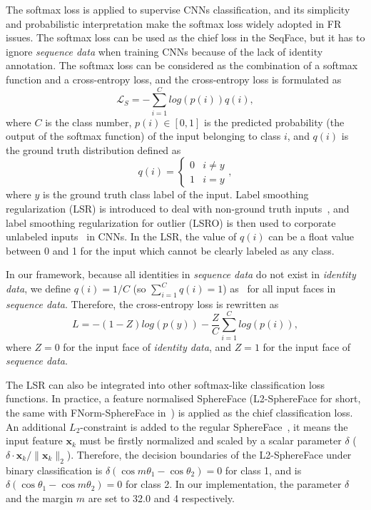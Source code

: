 \documentclass[conference]{acmsiggraph}
\renewcommand{\vec}[1]{\mathbf{#1}}
\begin{document}
The softmax loss is applied to supervise CNNs classification, and its simplicity and probabilistic interpretation make the softmax loss widely adopted in FR issues. The softmax loss can be used as the chief loss in the SeqFace, but it has to ignore \emph{sequence data} when training CNNs because of the lack of identity annotation. The softmax loss can be considered as the combination of a softmax function and a cross-entropy loss, and the cross-entropy loss is formulated as
\begin{equation}
\label{equLoss}
\mathcal{L}_S=-\sum\limits_{i=1}^Clog(p(i))q(i),
\end{equation}
where $C$ is the class number, $p(i) \in [0,1]$ is the predicted probability (the output of the softmax function) of the input belonging to class $i$, and $q(i)$ is the ground truth distribution defined as
\begin{equation}
\label{equQK}
q(i)=
\begin{cases}
0& i \neq y\\
1& i = y
\end{cases},
\end{equation}
where $y$ is the ground truth class label of the input. Label smoothing regularization (LSR) is introduced to deal with non-ground truth inputs~\cite{lsr}, and label smoothing regularization for outlier (LSRO) is then used to corporate unlabeled inputs~\cite{lsro} in CNNs. In the LSR, the value of $q(i)$ can be a float value between 0 and 1 for the input which cannot be clearly labeled as any class.

In our framework, because all identities in \emph{sequence data} do not exist in \emph{identity data}, we define $q(i) = 1/C$ (so $\sum\nolimits_{i=1}^Cq(i)=1$) as~\cite{lsro} for all input faces in \emph{sequence data}. Therefore, the cross-entropy loss is rewritten as
\begin{equation}
L=-(1-Z)log(p(y))-\frac{Z}{C}\sum\limits_{i=1}^Clog(p(i)),
\end{equation}
where $Z=0$ for the input face of \emph{identity data}, and $Z=1$ for the input face of \emph{sequence data}.

The LSR can also be integrated into other softmax-like classification loss functions. In practice, a feature normalised SphereFace (L2-SphereFace for short, the same with FNorm-SphereFace in~\cite{arcface}) is applied as the chief classification loss. An additional $L_2$-constraint is added to the regular SphereFace~\cite{sphereface}, it means the input feature $\vec{x}_k$ must be firstly normalized and scaled by a scalar parameter $\delta$ ($\delta \cdot \vec{x}_k / \|\vec{x}_k\|_2$). Therefore, the decision boundaries of the L2-SphereFace under binary classification is $\delta(\cos m\theta_1-\cos \theta_2)=0$ for class 1, and is $\delta(\cos \theta_1-\cos m\theta_2)=0$ for class 2. In our implementation, the parameter $\delta$ and the margin $m$ are set to 32.0 and 4 respectively.
\end{document}
